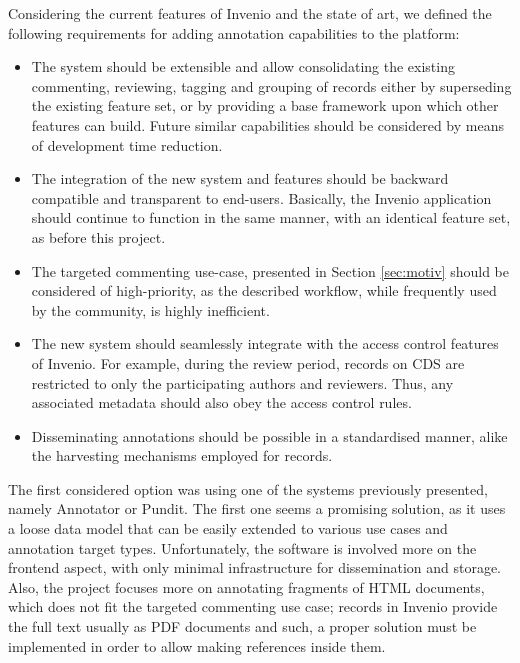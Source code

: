 
Considering the current features of Invenio and the state of art, we
defined the following requirements for adding annotation capabilities to
the platform:
\begin{itemize}
  \item The system should be extensible and allow consolidating the existing
        commenting, reviewing, tagging and grouping of records either by
        superseding the existing feature set, or by providing a base framework
        upon which other features can build. Future similar capabilities should
        be considered by means of development time reduction.
  \item The integration of the new system and features should be backward
        compatible and transparent to end-users. Basically, the Invenio
        application should continue to function in the same manner, with an
        identical feature set, as before this project.
  \item The targeted commenting use-case, presented in Section \ref{sec:motiv}
        should be considered of high-priority, as the described workflow, while
        frequently used by the community, is  highly inefficient.
  \item The new system should seamlessly integrate with the access control
        features of Invenio. For example, during the review period, records on
        CDS are restricted to only the participating authors and reviewers.
        Thus, any associated metadata should also obey the access control rules.
  \item Disseminating annotations should be possible in a standardised manner,
        alike the harvesting mechanisms employed for records.
\end{itemize}

The first considered option was using one of the systems previously presented,
namely Annotator or Pundit. The first one seems a promising solution, as it
uses a loose data model that can be easily extended to various use cases and
annotation target types. Unfortunately, the software is involved more on the
frontend aspect, with only minimal infrastructure for dissemination and
storage. Also, the project focuses more on annotating fragments of HTML
documents, which does not fit the targeted commenting use case; records in
Invenio provide the full text usually as PDF documents and such, a proper
solution must be implemented in order to allow making references inside them.

